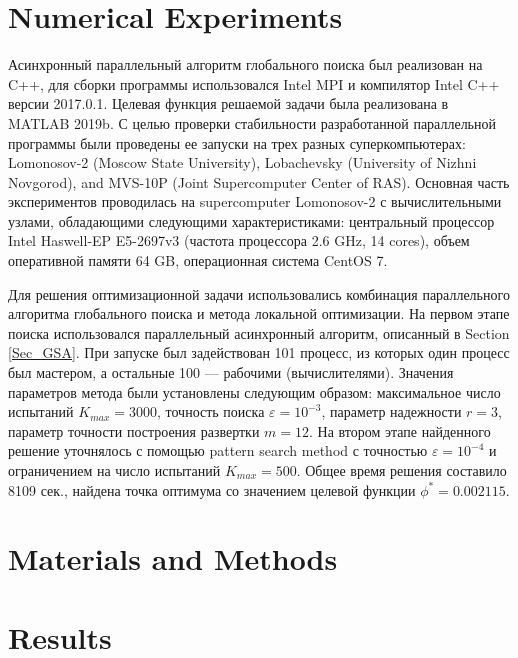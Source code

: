 \documentclass[mathematics,article,submit,pdftex,moreauthors]{Definitions/mdpi}
\begin{document}
\section{Numerical Experiments}

Асинхронный параллельный алгоритм глобального поиска был реализован на C++, для сборки программы использовался Intel MPI и компилятор Intel C++ версии 2017.0.1. Целевая функция решаемой задачи была реализована в MATLAB 2019b.
С целью проверки стабильности разработанной параллельной программы были проведены ее запуски на трех разных суперкомпьютерах: Lomonosov-2 (Moscow State University), Lobachevsky (University of Nizhni Novgorod), and MVS-10P (Joint Supercomputer Center of RAS). Основная часть экспериментов проводилась на supercomputer Lomonosov-2 с вычислительными узлами, обладающими следующими характеристиками: центральный процессор Intel Haswell-EP E5-2697v3 (частота процессора 2.6 GHz, 14 cores), объем оперативной памяти 64 GB, операционная система CentOS 7.

Для решения оптимизационной задачи использовались комбинация параллельного алгоритма глобального поиска и метода локальной оптимизации. На первом этапе поиска использовался параллельный асинхронный алгоритм, описанный в Section \ref{Sec_GSA}. При запуске был задействован 101 процесс, из которых один процесс был мастером, а остальные 100 --- рабочими (вычислителями). Значения параметров метода были установлены следующим образом: максимальное число испытаний $K_{max}=3000$, точность поиска $\varepsilon=10^{-3}$, параметр надежности $r=3$, параметр точности построения развертки $m=12$. На втором этапе найденного решение уточнялось с помощью pattern search method с точностью $\varepsilon=10^{-4}$ и ограничением на число испытаний $K_{max}=500$.
Общее время решения составило 8109 сек., найдена точка оптимума со значением целевой функции $\phi^* = 0.002115$.





\section{Materials and Methods}


\section{Results}
\end{document}
